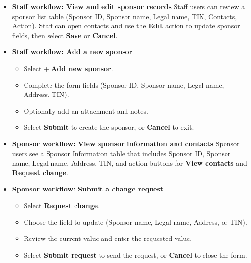 \begin{enumerate}
\begin{itemize}
\begin{itemize}
                        \item \textbf{Search contains} field (ID, name, or legal name)
                        \item + \textbf{Add new sponsor} button
                    \end{itemize}
                The + Add new sponsor button is right-aligned with the Sponsor and Search fields.
                \item \textbf{Staff workflow: View and edit sponsor records}
                Staff users can review a sponsor list table (Sponsor ID, Sponsor name, Legal name, TIN, Contacts, Action). Staff can open contacts and use the \textbf{Edit} action to update sponsor fields, then select \textbf{Save} or \textbf{Cancel}.
                \item \textbf{Staff workflow: Add a new sponsor}
                    \begin{itemize}
                        \item Select + \textbf{Add new sponsor}.
                        \item Complete the form fields (Sponsor ID, Sponsor name, Legal name, Address, TIN).
                        \item Optionally add an attachment and notes.
                        \item Select \textbf{Submit} to create the sponsor, or \textbf{Cancel} to exit.
                    \end{itemize}
                \item \textbf{Sponsor workflow: View sponsor information and contacts}
                Sponsor users see a Sponsor Information table that includes Sponsor ID, Sponsor name, Legal name, Address, TIN, and action buttons for \textbf{View contacts} and \textbf{Request change}.
                \item \textbf{Sponsor workflow: Submit a change request}
                    \begin{itemize}
                        \item Select \textbf{Request change}.
                        \item Choose the field to update (Sponsor name, Legal name, Address, or TIN).
                        \item Review the current value and enter the requested value.
                        \item Select \textbf{Submit request} to send the request, or \textbf{Cancel} to close the form.
                    \end{itemize}

\end{itemize}
\end{enumerate}
